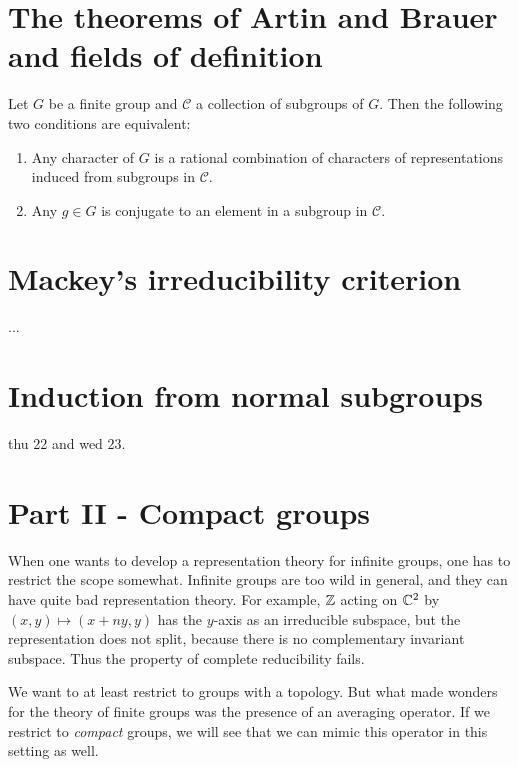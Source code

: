 \documentclass[11pt, english]{article}
\begin{document}
\section{The theorems of Artin and Brauer and fields of definition}

\begin{thm}[Artin]

Let $G$ be a finite group and $\mathscr C$ a collection of subgroups of $G$. Then the following two conditions are equivalent:
\begin{enumerate}
\item Any character of $G$ is a rational combination of characters of representations induced from subgroups in $\mathscr C$.
\item Any $g \in G$ is conjugate to an element in a subgroup in $\mathscr C$.
\end{enumerate}

\end{thm}

\section{Mackey's irreducibility criterion}

...

\section{Induction from normal subgroups}

thu 22 and wed 23.

\section{Part II - Compact groups}

When one wants to develop a representation theory for infinite groups, one has to restrict the scope somewhat. Infinite groups are too wild in general, and they can have quite bad representation theory. For example, $\mathbb{Z}$ acting on $\mathbb{C}^2$ by $(x,y) \mapsto (x+ny,y)$ has the $y$-axis as an irreducible subspace, but the representation does not split, because there is no complementary invariant subspace. Thus the property of complete reducibility fails. 

We want to at least restrict to groups with a topology. But what made wonders for the theory of finite groups was the presence of an averaging operator. If we restrict to \emph{compact} groups, we will see that we can mimic this operator in this setting as well.
\end{document}
